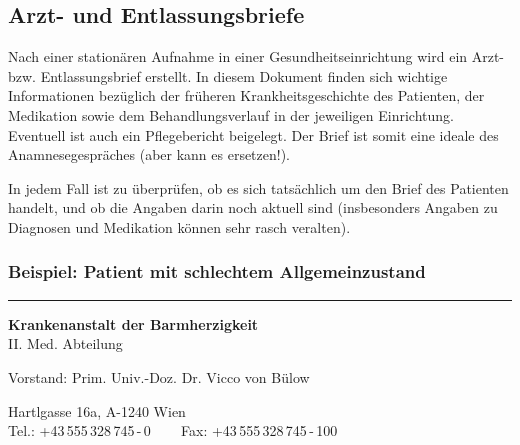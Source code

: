 \subsection{Arzt- und Entlassungsbriefe}

Nach einer stationären Aufnahme in einer
Gesundheitseinrichtung wird ein Arzt- bzw. Entlassungsbrief
erstellt. In
diesem Dokument finden sich wichtige Informationen bezüglich
der früheren Krankheitsgeschichte des Patienten, der
Medikation sowie dem Behandlungsverlauf in der jeweiligen
Einrichtung. Eventuell ist auch ein Pflegebericht beigelegt.
Der Brief ist somit eine ideale  des
Anamnesegespräches (aber kann es  ersetzen!).

In jedem Fall ist zu überprüfen, ob es sich tatsächlich um
den Brief des Patienten handelt, und ob die Angaben darin
noch aktuell sind (insbesonders Angaben zu Diagnosen und
Medikation können sehr rasch veralten).

\subsubsection{Beispiel: Patient mit schlechtem
Allgemeinzustand}

\hrule

\vspace{1em}

\begin{center}\sffamily
 \textbf{Krankenanstalt der Barmherzigkeit} 
 \\II. Med. Abteilung 
 
Vorstand: Prim. Univ.-Doz. Dr. Vicco von Bülow
 
{\scriptsize Hartlgasse 16a, A-1240 Wien
\\
Tel.: +43\,555\,328\,745\,-\,0 ~~~ Fax: +43\,555\,328\,745\,-\,100}
\end{center}

